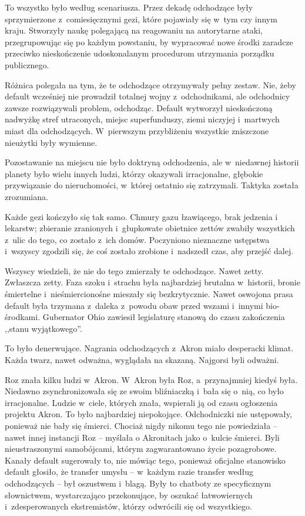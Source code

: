 \documentclass[oneside,polish,11pt,sfheadings]{mwbk}
\begin{document}
To wszystko było według scenariusza. Przez dekadę odchodzące były
sprzymierzone z~comiesięcznymi gezi, które pojawiały się w~tym czy innym
kraju. Stworzyły naukę polegającą na reagowaniu na autorytarne ataki,
przegrupowując się po każdym powstaniu, by wypracować nowe środki
zaradcze przeciwko nieskończenie udoskonalanym procedurom utrzymania
porządku publicznego.

Różnica polegała na tym, że te odchodzące otrzymywały pełny zestaw. Nie,
żeby default wcześniej nie prowadził totalnej wojny z~odchodnikami, ale
odchodnicy zawsze rozwiązywali problem, odchodząc. Default wytworzył
nieskończoną nadwyżkę stref utraconych, miejsc superfunduszy, ziemi
niczyjej i~martwych miast dla odchodzących. W~pierwszym przybliżeniu
wszystkie zniszczone nieużytki były wymienne.

Pozostawanie na miejscu nie było doktryną odchodzenia, ale w~niedawnej
historii planety było wielu innych ludzi, którzy okazywali irracjonalne,
głębokie przywiązanie do nieruchomości, w~której ostatnio się
zatrzymali. Taktyka została zrozumiana.

Każde gezi kończyło się tak samo. Chmury gazu łzawiącego, brak jedzenia
i lekarstw; zbieranie zranionych i~głupkowate obietnice zettów zwabiły
wszystkich z~ulic do tego, co zostało z~ich domów. Poczyniono nieznaczne
ustępstwa i~wszyscy zgodzili się, że coś zostało zrobione i~nadszedł
czas, aby przejść dalej.

Wszyscy wiedzieli, że nie do tego zmierzały te odchodzące. Nawet zetty.
Zwłaszcza zetty. Faza szoku i~strachu była najbardziej brutalna w~historii, bronie śmiertelne i~nieśmiercionośne mieszały się
bezkrytycznie. Nawet oswojona prasa default była trzymana z~daleka z~powodu obaw przed wszami i~innymi bio-środkami. Gubernator Ohio zawiesił
legislaturę stanową do czasu zakończenia ,,stanu wyjątkowego''.

To było denerwujące. Nagrania odchodzących z~Akron miało desperacki
klimat. Każda twarz, nawet odważna, wyglądała na skazaną. Najgorsi byli
odważni.

Roz znała kilku ludzi w~Akron. W~Akron była Roz, a~przynajmniej kiedyś
była. Niedawno zsynchronizowała się ze swoim bliźniaczką i~bała się o~nią, co było irracjonalne. Ludzie w~ciele, których znała, wspierali ją
od czasu ogłoszenia projektu Akron. To było najbardziej niepokojące.
Odchodniczki nie ustępowały, ponieważ nie bały się śmierci. Chociaż
nigdy nikomu tego nie powiedziała -- nawet innej instancji Roz -- myślała
o Akronitach jako o~kulcie śmierci. Byli nieustraszonymi samobójcami,
którym zagwarantowano życie pozagrobowe. Kanały default sugerowały to,
nie mówiąc tego, ponieważ oficjalne stanowisko default głosiło, że
transfer umysłu -- w~każdym razie transfer według odchodzących -- był
oszustwem i~blagą. Były to chatboty ze specyficznym słownictwem,
wystarczająco przekonujące, by oszukać łatwowiernych i~zdesperowanych
ekstremistów, którzy odwrócili się od wszystkiego.
\end{document}
